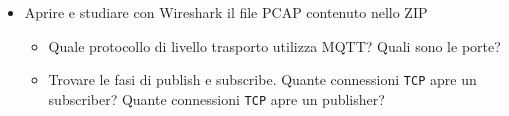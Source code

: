 \documentclass[11pt]{article}
\begin{document}
\begin{tcolorbox}[colback=blue!5!white,colframe=blue!75!black,title=\textbf{DOMANDA}, breakable]
\begin{itemize}
    \item Aprire e studiare con Wireshark il file PCAP contenuto nello ZIP
    \begin{itemize}
        \item Quale protocollo di livello trasporto utilizza MQTT? Quali sono le porte?
        \item Trovare le fasi di publish e subscribe. Quante connessioni \texttt{TCP} apre un subscriber? Quante connessioni \texttt{TCP} apre un publisher?
    \end{itemize}
\end{itemize}
\end{tcolorbox}
\end{document}
